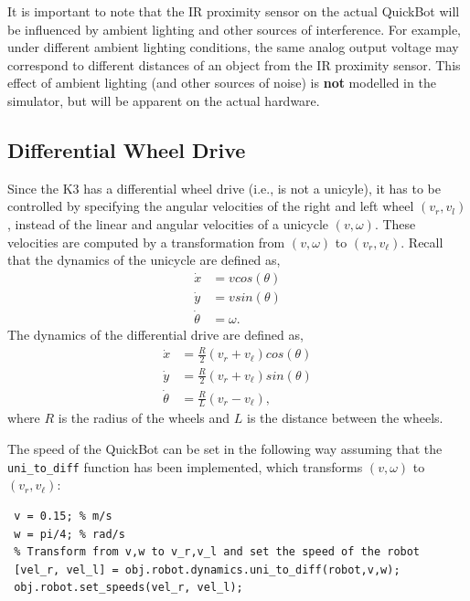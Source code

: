 \documentclass[10pt]{article}
\begin{document}
It is important to note that the IR proximity sensor on the actual QuickBot will be influenced by ambient lighting and other sources of interference. For example, under different ambient lighting conditions, the same analog output voltage may correspond to different distances of an object from the IR proximity sensor. This effect of ambient lighting (and other sources of noise) is \textbf{not} modelled in the simulator, but will be apparent on the actual hardware.

\subsection{Differential Wheel Drive}\label{diffdrive}
Since the K3 has a differential wheel drive (i.e., is not a unicyle), it has to be controlled by specifying the angular velocities of the right and left wheel $(v_r,v_l)$, instead of the linear and angular velocities of a unicycle $(v,\omega)$. These velocities are computed by a transformation from $(v,\omega)$ to $(v_r,v_\ell)$. Recall that the dynamics of the unicycle are defined as,
\begin{equation}
 \begin{split}
   \dot{x} &= vcos(\theta) \\
   \dot{y} &= vsin(\theta) \\
   \dot{\theta} &= \omega.
 \end{split}
\end{equation}
The dynamics of the differential drive are defined as,
\begin{equation}
 \begin{split}
  \dot{x} &= \frac{R}{2}(v_r+v_\ell)cos(\theta) \\
  \dot{y} &= \frac{R}{2}(v_r+v_\ell)sin(\theta) \\
  \dot{\theta} &= \frac{R}{L}(v_r-v_\ell),
 \end{split}
\end{equation}
where $R$ is the radius of the wheels and $L$ is the distance between the wheels.

The speed of the QuickBot can be set in the following way assuming that the \texttt{uni\_to\_diff} function has been implemented, which transforms $(v,\omega)$ to $(v_r,v_\ell)$:
\begin{verbatim}
 v = 0.15; % m/s
 w = pi/4; % rad/s
 % Transform from v,w to v_r,v_l and set the speed of the robot
 [vel_r, vel_l] = obj.robot.dynamics.uni_to_diff(robot,v,w);
 obj.robot.set_speeds(vel_r, vel_l);
\end{verbatim}
\end{document}
